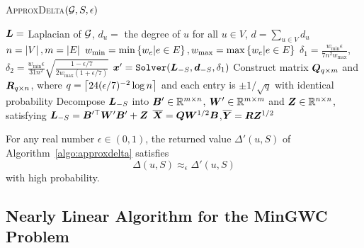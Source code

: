 \documentclass[10pt,twocolumn,twoside]{IEEEtran}
\begin{document}
\begin{algorithm}
    \caption{\textsc{ApproxDelta}\((\mathcal{G},S,\epsilon)\)}
    \label{algo:approxdelta}
    \(\boldsymbol{L}=\) Laplacian of \(\mathcal{G}\), \(d_u=\) the degree of \(u\) for all \(u\in V\), \(d=\sum_{u \in V} d_u\)\;
    \(n=\left|V \right|,m=\left|E \right|\)\;
    \(w_{\min}=\min\left\{w_e|e\in E \right\},w_{\max}=\max\left\{w_e|e\in E \right\}\)\;
    \(\delta_1= \frac{w_{\min}\epsilon}{7n^2w_{\max}}\),\(\delta_2= \frac{w_{\min}\epsilon}{31n^2}\sqrt{\frac{1-\epsilon/7}{2w_{\max}(1+\epsilon/7)}}\)\;
    \(\boldsymbol{x}'=\mathtt{Solver}(\boldsymbol{L}_{-S},\boldsymbol{d}_{-S},\delta_1)\)\;
    Construct matrix \(\boldsymbol{Q}_{q\times m}\) and \(\boldsymbol{R}_{q\times n}\), where \(q=\left\lceil24(\epsilon/7)^{-2}\log n\right\rceil\) and each entry is \(\pm 1/\sqrt{q}\) with identical probability\;
    Decompose \(\boldsymbol{L}_{-S}\) into \(\boldsymbol{B}'\in\mathbb{R}^{m\times n}\), \(\boldsymbol{W}'\in\mathbb{R}^{m\times m}\) and \(\boldsymbol{Z}\in\mathbb{R}^{n\times n}\), satisfying \(\boldsymbol{L}_{-S}=\boldsymbol{B}'^\top\boldsymbol{W}'\boldsymbol{B}'+\boldsymbol{Z}\)\;
    \(\overline{\boldsymbol{X}}=\boldsymbol{Q}\boldsymbol{W}^{1/2}\boldsymbol{B}\),\(\overline{\boldsymbol{Y}}=\boldsymbol{R}\boldsymbol{Z}^{1/2}\)\;

\end{algorithm}

\begin{lemma}\label{lem:approx-marginest}
    For any real number \(\epsilon\in(0,1)\), the returned value \(\Delta'(u,S)\) of Algorithm~\ref{algo:approxdelta} satisfies
    \begin{equation*}
        \Delta(u,S)\approx_\epsilon \Delta'(u,S)
    \end{equation*}
    with high probability.
\end{lemma}






\subsection{Nearly Linear Algorithm for the MinGWC Problem}
\end{document}
